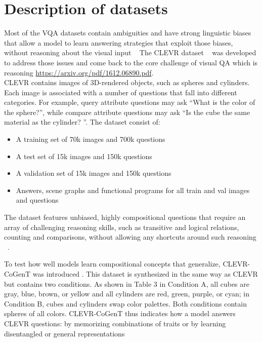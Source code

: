 \appendix

\section{Description of datasets}

Most of the VQA datasets contain ambiguities and have strong linguistic biases that allow a model to learn answering strategies that exploit those biases, without reasoning about the visual input ~\cite{Santoro2017ASN}
The CLEVR dataset ~\cite{johnson2017clevr}  was developed to address those issues and come back to the core challenge of visual QA which is reasoning  \href{url}{https://arxiv.org/pdf/1612.06890.pdf}.\\
CLEVR contains images of 3D-rendered objects, such as spheres and cylinders. Each image is associated with a number of questions that fall into different categories. For example, query attribute questions may ask “What is the color of the sphere?”, while compare attribute questions may ask “Is the cube the same material as the cylinder? ”.
The dataset consist of:
\begin{itemize}
\item 	A training set of 70k images and 700k questions
\item	A test  set of 15k images and 150k questions 
\item	A validation set of 15k images and 150k 
 questions
\item	Answers, scene graphs and functional programs for all train and val images and questions

\end{itemize}

The dataset features unbiased, highly compositional questions that require an array of challenging reasoning skills, such as transitive and logical relations, counting and comparisons, without allowing any shortcuts around such reasoning ~\cite{hudson2018compositional}.

To test how well models learn compositional concepts that generalize, CLEVR-CoGenT was introduced . This dataset is synthesized in the same way as CLEVR but contains two conditions. As shown in Table 3 in Condition A, all cubes are gray, blue, brown, or yellow and all cylinders are red, green, purple, or cyan; in Condition B, cubes and cylinders swap color palettes.
Both conditions contain spheres of all colors. CLEVR-CoGenT thus indicates how a model answers CLEVR questions: by memorizing combinations of traits or by learning disentangled or general representations ~\cite{perez2017film}

